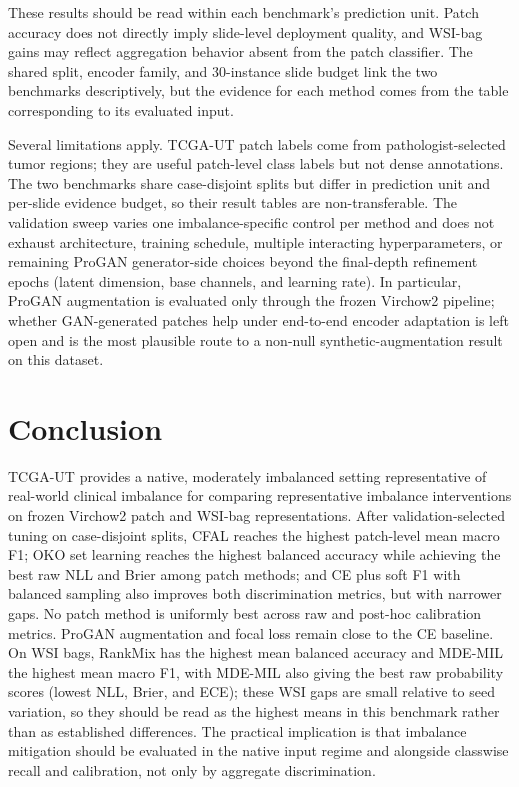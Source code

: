 \documentclass[11pt]{article}
\begin{document}
These results should be read within each benchmark's prediction unit. Patch accuracy does not directly imply slide-level deployment quality, and WSI-bag gains may reflect aggregation behavior absent from the patch classifier. The shared split, encoder family, and 30-instance slide budget link the two benchmarks descriptively, but the evidence for each method comes from the table corresponding to its evaluated input.

Several limitations apply. TCGA-UT patch labels come from pathologist-selected tumor regions; they are useful patch-level class labels but not dense annotations. The two benchmarks share case-disjoint splits but differ in prediction unit and per-slide evidence budget, so their result tables are non-transferable. The validation sweep varies one imbalance-specific control per method and does not exhaust architecture, training schedule, multiple interacting hyperparameters, or remaining ProGAN generator-side choices beyond the final-depth refinement epochs (latent dimension, base channels, and learning rate). In particular, ProGAN augmentation is evaluated only through the frozen Virchow2 pipeline; whether GAN-generated patches help under end-to-end encoder adaptation is left open and is the most plausible route to a non-null synthetic-augmentation result on this dataset.

\section{Conclusion}
TCGA-UT provides a native, moderately imbalanced setting representative of real-world clinical imbalance for comparing representative imbalance interventions on frozen Virchow2 patch and WSI-bag representations. After validation-selected tuning on case-disjoint splits, CFAL reaches the highest patch-level mean macro F1; OKO set learning reaches the highest balanced accuracy while achieving the best raw NLL and Brier among patch methods; and CE plus soft F1 with balanced sampling also improves both discrimination metrics, but with narrower gaps. No patch method is uniformly best across raw and post-hoc calibration metrics. ProGAN augmentation and focal loss remain close to the CE baseline. On WSI bags, RankMix has the highest mean balanced accuracy and MDE-MIL the highest mean macro F1, with MDE-MIL also giving the best raw probability scores (lowest NLL, Brier, and ECE); these WSI gaps are small relative to seed variation, so they should be read as the highest means in this benchmark rather than as established differences. The practical implication is that imbalance mitigation should be evaluated in the native input regime and alongside classwise recall and calibration, not only by aggregate discrimination.
\end{document}
